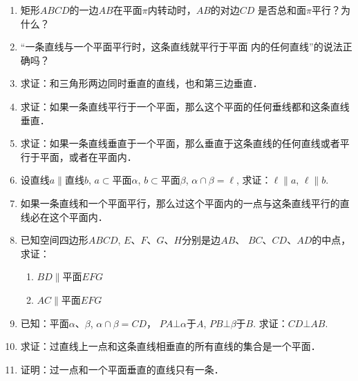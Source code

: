 \begin{enumerate}
  \item 矩形$ABCD$的一边$AB$在平面$\pi$内转动时，$AB$的对边$CD$
  是否总和面$\pi$平行？为什么？
  \item “一条直线与一个平面平行时，这条直线就平行于平面
  内的任何直线”的说法正确吗？
  \item 求证：和三角形两边同时垂直的直线，也和第三边垂直．
  \item 求证：如果一条直线平行于一个平面，那么这个平面的任何垂线都和这条直线垂直．
  \item 求证：如果一条直线垂直于一个平面，那么垂直于这条直线的任何直线或者平行于平面，或者在平面内．
  \item 设直线$a\parallel$直线$b$, $a\subset$平面$\alpha$, $b\subset$平面$\beta$, $\alpha\cap\beta=\ell$, 求证：$\ell\parallel a$, $\ell\parallel b$.
  \item 如果一条直线和一个平面平行，那么过这个平面内的一点与这条直线平行的直线必在这个平面内．
  \item 已知空间四边形$ABCD$, $E$、$F$、$G$、$H$分别是边$AB$、
  $BC$、$CD$、$AD$的中点，求证：
\begin{enumerate}
  \item $BD\parallel$平面$EFG$
  \item $AC\parallel $平面$EFG$
\end{enumerate}

\item 已知：平面$\alpha$、$\beta$, $\alpha\cap\beta=CD$，
$PA\bot\alpha$于$A$, $PB\bot\beta$于$B$. 求证：$CD\bot AB$.
\item 求证：过直线上一点和这条直线相垂直的所有直线的集合是一个平面．
\item 证明：过一点和一个平面垂直的直线只有一条．

\begin{figure}[htp]
  \centering
  \begin{minipage}[t]{0.48\textwidth}
  \centering
\end{minipage}
\end{figure}
\end{enumerate}
